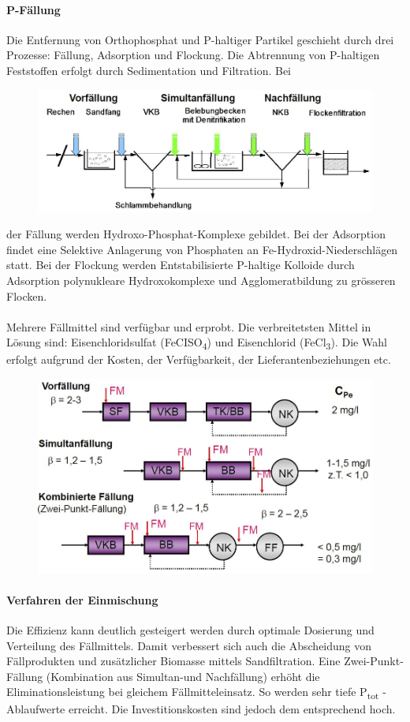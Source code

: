 \documentclass[9pt, openright=false]{scrartcl}
\begin{document}
\paragraph{P-Fällung} Die Entfernung von Orthophosphat und P-haltiger Partikel geschieht durch drei Prozesse: Fällung, Adsorption und Flockung. Die Abtrennung von P-haltigen Feststoffen erfolgt durch Sedimentation und Filtration. Bei\begin{figure} 
  \includegraphics[width=.5\textwidth]{images/faellung}
\end{figure} der Fällung werden Hydroxo-Phosphat-Komplexe gebildet. Bei der Adsorption findet eine Selektive Anlagerung von Phosphaten an Fe-Hydroxid-Niederschlägen statt. Bei der Flockung werden Entstabilisierte P-haltige Kolloide durch 
Adsorption polynukleare Hydroxokomplexe und Agglomeratbildung zu grösseren Flocken.\\ \\
Mehrere Fällmittel sind verfügbar und erprobt. Die verbreitetsten Mittel in Lösung sind: Eisenchloridsulfat (FeCISO\textsubscript{4}) und Eisenchlorid (FeCl\textsubscript{3}). Die Wahl erfolgt aufgrund der Kosten, der Verfügbarkeit, der Lieferantenbeziehungen etc.\begin{figure} 
  \includegraphics[width=.45\textwidth]{images/dosierung}
\end{figure}
\paragraph{Verfahren der Einmischung} Die Effizienz kann deutlich gesteigert werden durch optimale Dosierung und Verteilung des Fällmittels. Damit verbessert sich auch die Abscheidung von Fällprodukten und zusätzlicher Biomasse mittels Sandfiltration. Eine Zwei-Punkt-Fällung (Kombination aus Simultan-und Nachfällung) erhöht die Eliminationsleistung bei gleichem Fällmitteleinsatz. So werden sehr tiefe P\textsubscript{tot} - Ablaufwerte erreicht. Die Investitionskosten sind jedoch dem entsprechend hoch. 
\end{document}
